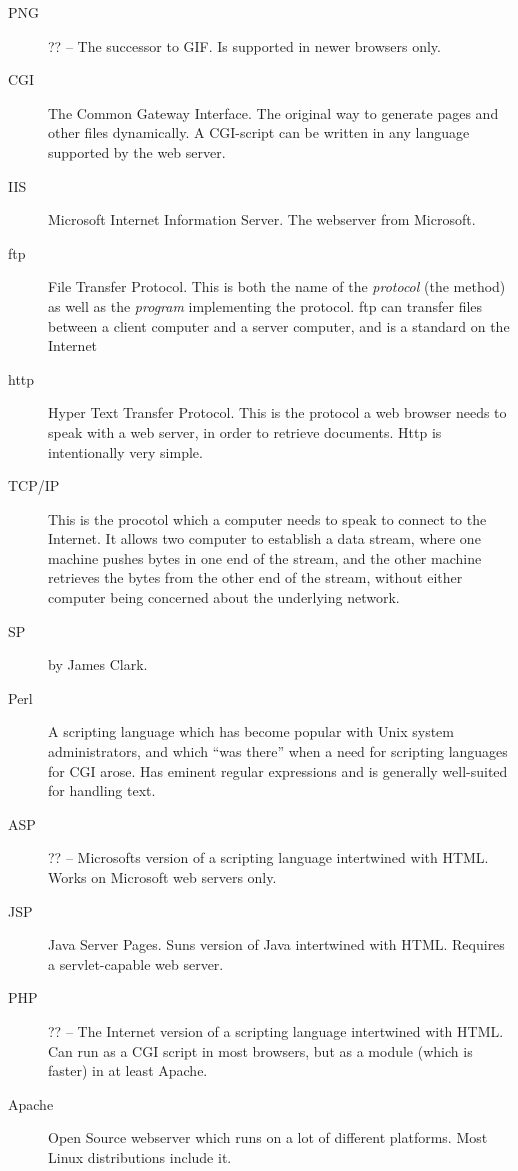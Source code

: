 \begin{description}
\item[PNG] \textsf{??} -- The successor to GIF.  Is supported in newer
  browsers only.
  
\item[CGI] The Common Gateway Interface.  The original way to generate
  pages and other files dynamically.  A CGI-script can be written in
  any language supported by the web server.

\item[IIS] Microsoft Internet Information Server.  The webserver from
  Microsoft. 
  
\item[ftp] File Transfer Protocol.  This is both the name of the
  \textit{protocol} (the method) as well as the \textit{program}
  implementing the protocol.  ftp can transfer files between a client
  computer and a server computer, and is a standard on the Internet
  
\item[http] Hyper Text Transfer Protocol.  This is the protocol a web
  browser needs to speak with a web server, in order to retrieve
  documents.  Http is intentionally very simple.
\item[TCP/IP] This is the procotol which a computer needs to speak to
  connect to the Internet.  It allows two computer to establish a data
  stream, where one machine pushes bytes in one end of the stream, and
  the other machine retrieves the bytes from the other end of the
  stream, without either computer being concerned about the underlying
  network.
  
\item[SP]  by James Clark.
  
\item[Perl] A scripting language which has become popular with Unix
  system administrators, and which ``was there'' when a need for
  scripting languages for CGI arose.  Has eminent regular expressions
  and is generally well-suited for handling text.
  
\item[ASP] \textsf{??} -- Microsofts version of a scripting language
  intertwined with HTML. Works on Microsoft web servers only.
  
\item[JSP] Java Server Pages.  Suns version of Java intertwined with
  HTML.  Requires a servlet-capable web server.
  
\item[PHP] \textsf{??} -- The Internet version of a scripting language
  intertwined with HTML.  Can run as a CGI script in most browsers,
  but as a module (which is faster) in at least Apache.
\item[Apache] Open Source webserver which runs on a lot of different
  platforms.  Most Linux distributions include it.


\end{description}
